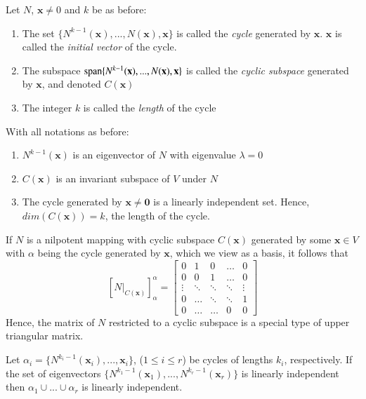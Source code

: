 \documentclass[12pt]{report}
\newcommand{\mb}[1]{\mathbf{#1}}
\begin{document}
\begin{defn}{}{}
    Let $N$, $\mb x \neq 0$ and $k$ be as before:
    \begin{enumerate}
        \item The set $\{N^{k-1}(\mb x),...,N(\mb x), \mb x\}$ is called the \emph{cycle} generated by $\mb x$. $\mb x$ is called the \emph{initial vector} of the cycle.
        \item The subspace $\spn\{N^{k-1}(\mb x),...,N(\mb x), \mb x\}$ is called the \emph{cyclic subspace} generated by $\mb x$, and denoted $C(\mb x)$
        \item The integer $k$ is called the \emph{length} of the cycle
    \end{enumerate}
\end{defn}


\begin{prop}{}{}
    With all notations as before:
    \begin{enumerate}
        \item $N^{k-1}(\mb x)$ is an eigenvector of $N$ with eigenvalue $\lambda = 0$
        \item $C(\mb x)$ is an invariant subspace of $V$ under $N$
        \item The cycle generated by $\mb x \neq \mb 0$ is a linearly independent set. Hence, $dim(C(\mb x)) = k$, the length of the cycle.
    \end{enumerate}
\end{prop}

\begin{obs}{}{}
    If $N$ is a nilpotent mapping with cyclic subspace $C(\mb x)$ generated by some $\mb x \in V$ with $\alpha$ being the cycle generated by $\mb x$, which we view as a basis, it follows that $$[N\rvert_{C(\mb x)}]_{\alpha}^{\alpha} = \begin{bmatrix} 0 & 1 & 0 & \hdots & 0 \\ 0 & 0 & 1 & \hdots & 0 \\ \vdots & \ddots & \ddots & \ddots & \vdots \\ 0 & \hdots & \ddots & \ddots & 1 \\ 0 & \hdots & \hdots & 0 & 0 \end{bmatrix}$$
    Hence, the matrix of $N$ restricted to a cyclic subspace is a special type of upper triangular matrix.
\end{obs}


\begin{prop}{}{}
    Let $\alpha_i = \{N^{k_i - 1}(\mb x_i),..., \mb x_i\}$, ($1 \leq i \leq r$) be cycles of lengths $k_i$, respectively. If the set of eigenvectors $\{N^{k_1-1}(\mb x_1),...,N^{k_r-1}(\mb x_r)\}$ is linearly independent then $\alpha_1 \cup ... \cup \alpha_r$ is linearly independent.
\end{prop}
\end{document}
